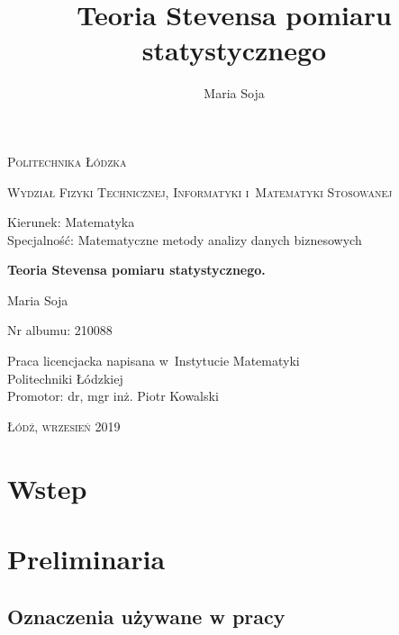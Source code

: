 \documentclass[12pt,a4paper]{report}
\author{Maria Soja}
\title{Teoria Stevensa pomiaru statystycznego}
\begin{document}
\begin{titlepage}
\begin{flushleft}
\end{flushleft}
\begin{center}
\textsc{{\huge Politechnika Łódzka}}
\end{center}
\bigskip
\bigskip
\begin{center}
\textsc{{\Large Wydział Fizyki Technicznej, Informatyki i~Matematyki Stosowanej}}
\end{center}
\bigskip
\bigskip
\begin{Large}
Kierunek: Matematyka 
\\Specjalność: Matematyczne metody analizy danych biznesowych

\end{Large}
\bigskip
\bigskip
\noindent\hrulefill
\begin{center}
{\textbf{{\Large Teoria Stevensa pomiaru statystycznego.}}}
\end{center}
\begin{flushright}
{\large 
Maria Soja

Nr albumu: 
210088
}
\end{flushright}
\noindent\hrulefill
\bigskip
\bigskip
\begin{center}
{\large Praca licencjacka
napisana w~Instytucie Matematyki 
\\Politechniki Łódzkiej 
\bigskip
\bigskip
\\Promotor: dr, mgr inż. Piotr Kowalski
 }
\end{center}
\bigskip
\bigskip
\bigskip
\bigskip
\begin{center}
{\textsc{\large Łódź, wrzesień 2019}}
\end{center}
\end{titlepage}


\tableofcontents

\chapter{Wstep}

\chapter{Preliminaria}

\section{Oznaczenia używane w pracy}
\end{document}
